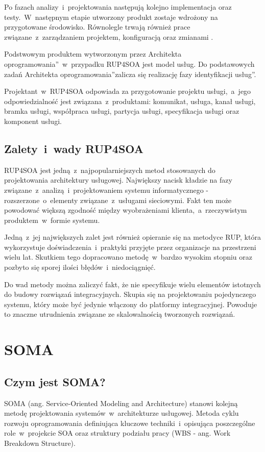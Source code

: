 Po fazach analizy~i~projektowania następują kolejno implementacja oraz testy.~W~następnym etapie utworzony produkt zostaje wdrożony na przygotowane środowisko. Równolegle trwają również prace związane~z~zarządzaniem projektem, konfiguracją oraz zmianami \cite{PlatIntGor}.

Podstwowym produktem wytworzonym przez \quotedblbase Architekta oprogramowania\textquotedblright~w~przypadku RUP4SOA jest model usług. Do podstawowych zadań \quotedblbase Architekta oprogramowania\textquotedblright zalicza się realizację fazy \quotedblbase identyfikacji usług\textquotedblright.

Projektant~w~RUP4SOA odpowiada za przygotowanie projektu usługi,~a~jego odpowiedzialność jest związana~z~produktami: komunikat, usługa, kanał usługi, bramka usługi, współpraca usługi, partycja usługi, specyfikacja usługi oraz komponent usługi. 

\subsection{Zalety~i~wady RUP4SOA}
RUP4SOA jest jedną~z~najpopularniejszych metod stosowanych do projektowania architektury usługowej. Największy nacisk kładzie na fazy związane~z~analizą~i~projektowaniem systemu informatycznego - rozszerzone~o~elementy związane~z~usługami sieciowymi. Fakt ten może powodować większą zgodność między wyobrażeniami klienta,~a~rzeczywistym produktem~w~formie systemu. 

Jedną~z~jej największych zalet jest również opieranie się na metodyce RUP, która wykorzystuje doświadczenia~i~praktyki przyjęte przez organizacje na przestrzeni wielu lat. \cite{JonSimRUPSoa} Skutkiem tego dopracowano metodę~w~bardzo wysokim stopniu oraz pozbyto się sporej ilości błędów~i~niedociągnięć.

Do wad metody można zaliczyć fakt, że nie specyfikuje wielu elementów istotnych do budowy rozwiązań integracyjnych. Skupia się na projektowaniu pojedynczego systemu, który może być jedynie włączony do platformy integracyjnej. \cite{PlatIntGor} Powoduje to znaczne utrudnienia związane ze skalowalnością tworzonych rozwiązań.

\section{SOMA}
\subsection{Czym jest SOMA?}
SOMA (ang. Service-Oriented Modeling and Architecture) stanowi kolejną metodę projektowania systemów~w~architekturze usługowej. Metoda cyklu rozwoju oprogramowania definiująca kluczowe techniki~i~opisująca poszczególne role~w~projekcie SOA oraz struktury podziału pracy (WBS - ang. Work Breakdown Structure). 

